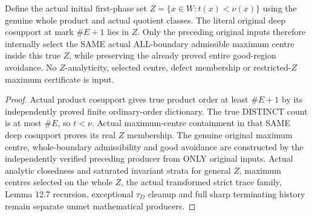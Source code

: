 \begin{theorem}
\label{hir:sharp-original-deep-product-actual-centre-in-distinct-defect-phase}
\leanok
Define the actual initial first-phase set
$Z=\{x\in W:t(x)<\nu(x)\}$ using the genuine whole product and actual quotient
classes. The literal original deep cosupport at mark $\#E+1$ lies in $Z$.
Only the preceding original inputs therefore internally select the SAME actual
ALL-boundary admissible maximum centre inside this true $Z$, while preserving
the already proved entire good-region avoidance. No $Z$-analyticity, selected
centre, defect membership or restricted-$Z$ maximum certificate is input.
\end{theorem}
\begin{proof}
Actual product cosupport gives true product order at least $\#E+1$ by its
independently proved finite ordinary-order dictionary. The true DISTINCT count
is at most $\#E$, so $t<\nu$. Actual maximum-centre containment in that SAME
deep cosupport proves its real $Z$ membership. The genuine original maximum
centre, whole-boundary admissibility and good avoidance are constructed by
the independently verified preceding producer from ONLY original inputs.
Actual analytic closedness and saturated invariant strata for general $Z$,
maximum centres selected on the whole $Z$, the actual transformed strict trace
family, Lemma 12.7 recursion, exceptional $\tau_D$ cleanup and full sharp
terminating history remain separate unmet mathematical producers.
\end{proof}
